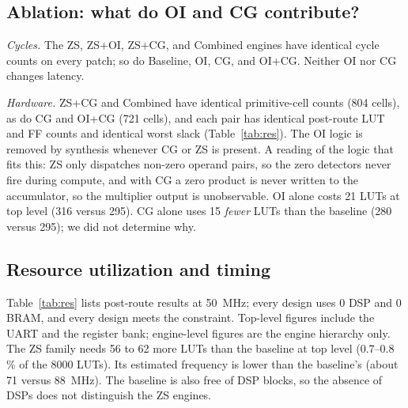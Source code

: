 \documentclass[11pt,journal,draftclsnofoot,onecolumn]{IEEEtran}
\begin{document}
\subsection{Ablation: what do OI and CG contribute?}\label{sec:r-ablation}
\emph{Cycles.} The ZS, ZS+OI, ZS+CG, and Combined engines have identical cycle counts on
every patch; so do Baseline, OI, CG, and OI+CG. Neither OI nor CG changes latency.

\emph{Hardware.} ZS+CG and Combined have identical primitive-cell counts (804 cells), as
do CG and OI+CG (721 cells), and each pair has identical post-route LUT and FF counts and
identical worst slack (Table~\ref{tab:res}). The OI logic is removed by synthesis whenever
CG or ZS is present. A reading of the logic that fits this: ZS only dispatches non-zero
operand pairs, so the zero detectors never fire during compute, and with CG a zero
product is never written to the accumulator, so the multiplier output is unobservable.
OI alone costs 21 LUTs at top level (316 versus 295). CG alone uses 15 \emph{fewer} LUTs
than the baseline (280 versus 295); we did not determine why.

\subsection{Resource utilization and timing}\label{sec:r-res}
Table~\ref{tab:res} lists post-route results at 50~MHz; every design uses 0 DSP and 0
BRAM, and every design meets the constraint. Top-level figures include the UART and the
register bank; engine-level figures are the engine hierarchy only. The ZS family needs 56
to 62 more LUTs than the baseline at top level (0.7--0.8\,\% of the 8000 LUTs). Its
estimated frequency is lower than the baseline's (about 71 versus 88~MHz). The baseline
is also free of DSP blocks, so the absence of DSPs does not distinguish the ZS engines.
\end{document}
